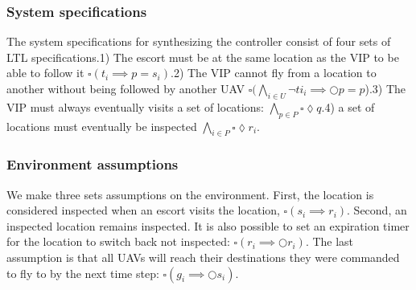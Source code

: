 \documentclass[]{article}
\begin{document}
\subsubsection{System specifications}\label{system-specifications}
The system specifications for synthesizing the controller consist of four sets of LTL specifications.1) The escort must be at the same location as the VIP to be able to follow it $\square (t_{i} \implies p = s_{i})$.2) The VIP cannot fly from a location to another without being followed by another UAV $\square(\bigwedge\limits_{i\in U}\lnot ti_{i} \implies \Circle p = p$).3) The VIP must always eventually visits a set of locations: $\bigwedge\limits_{p\in P}\square \lozenge q$.4) a set of locations must eventually be inspected $\bigwedge\limits_{i\in P}\square \lozenge r_{i}$.
\subsubsection{Environment assumptions}\label{environment-assumptions}
We make three sets assumptions on the environment. First, the location is considered inspected when an escort visits the location, $\square (s_{i} \implies r_{i})$. Second, an inspected location remains inspected. It is also possible to set an expiration timer for the location to switch back not inspected: $\square (r_{i} \implies \Circle r_{i})$. The last assumption is that all UAVs will reach their destinations they were commanded to fly to by the next time step: $\square (g_{i} \implies \Circle s_{i})$.
\end{document}
